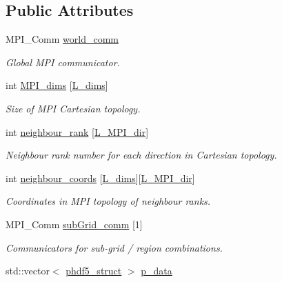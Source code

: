 \subsection*{Public Attributes}
\begin{DoxyCompactItemize}
\item 
M\+P\+I\+\_\+\+Comm \hyperlink{class_mpi_manager_aec1ed834d1a8fa19f87499fb0d5cd332}{world\+\_\+comm}
\begin{DoxyCompactList}\small\item\em Global M\+PI communicator. \end{DoxyCompactList}\item 
int \hyperlink{class_mpi_manager_a8e2e923e656c338148d42517323c9586}{M\+P\+I\+\_\+dims} \mbox{[}\hyperlink{definitions_8h_a11cd469956bf6689c2bc034ee698e0b7}{L\+\_\+dims}\mbox{]}
\begin{DoxyCompactList}\small\item\em Size of M\+PI Cartesian topology. \end{DoxyCompactList}\item 
int \hyperlink{class_mpi_manager_a3f3db562bc7ba8871180c5c9ac388c13}{neighbour\+\_\+rank} \mbox{[}\hyperlink{definitions_8h_a3310be18f0cfda9ca2a17c51518a97e9}{L\+\_\+\+M\+P\+I\+\_\+dir}\mbox{]}
\begin{DoxyCompactList}\small\item\em Neighbour rank number for each direction in Cartesian topology. \end{DoxyCompactList}\item 
int \hyperlink{class_mpi_manager_a6db3764ecc637f90afded1f783acb244}{neighbour\+\_\+coords} \mbox{[}\hyperlink{definitions_8h_a11cd469956bf6689c2bc034ee698e0b7}{L\+\_\+dims}\mbox{]}\mbox{[}\hyperlink{definitions_8h_a3310be18f0cfda9ca2a17c51518a97e9}{L\+\_\+\+M\+P\+I\+\_\+dir}\mbox{]}
\begin{DoxyCompactList}\small\item\em Coordinates in M\+PI topology of neighbour ranks. \end{DoxyCompactList}\item 
M\+P\+I\+\_\+\+Comm \hyperlink{class_mpi_manager_a32921c381b76fb8f27d3334ebd1756cd}{sub\+Grid\+\_\+comm} \mbox{[}1\mbox{]}
\begin{DoxyCompactList}\small\item\em Communicators for sub-\/grid / region combinations. \end{DoxyCompactList}\item 
std\+::vector$<$ \hyperlink{struct_mpi_manager_1_1phdf5__struct}{phdf5\+\_\+struct} $>$ \hyperlink{class_mpi_manager_a03972530e718d5b0a7f119e9c6132179}{p\+\_\+data}

\end{DoxyCompactItemize}
